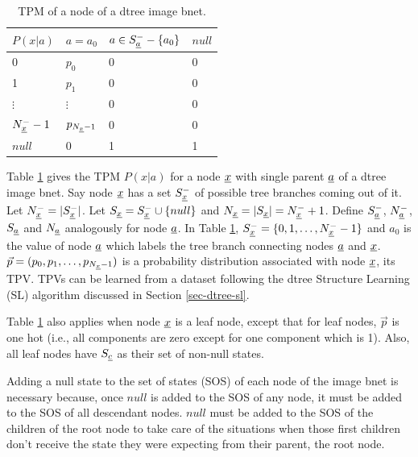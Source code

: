 \begin{table}[]
\centering
\begin{tabular}{|l|l|l|l|}
\hline
$P(x|a)$ & \cellcolor[HTML]{ECF4FF}$a=a_0$ & \cellcolor[HTML]{ECF4FF}$a\in S^-_{\underline{a}}-\{a_0\}$ & \cellcolor[HTML]{ECF4FF}$null$ \\ \hline
\cellcolor[HTML]{ECF4FF}0 & $p_0$ & 0 & 0 \\ \hline
\cellcolor[HTML]{ECF4FF}1 & $p_1$ & 0 & 0 \\ \hline
\cellcolor[HTML]{ECF4FF}$\vdots$ & $\vdots$ & 0 & 0 \\ \hline
\cellcolor[HTML]{ECF4FF}$N^-_{\underline{x}}-1$ & $p_{N_{\underline{x}}-1}$ & 0 & 0 \\ \hline
\cellcolor[HTML]{ECF4FF}$null$ & 0 & 1 & 1 \\ \hline
\end{tabular}
\caption{TPM of a node of a dtree image bnet.}
\label{tab-dtree-tpm}
\end{table}


Table \ref{tab-dtree-tpm}
gives the 
TPM $P(x|a)$
for a node ${\underline{x}}$
with single parent ${\underline{a}}$
of a dtree image bnet. 
Say node ${\underline{x}}$ has 
a set $S^-_{\underline{x}}$
of possible tree branches
coming out of it. 
Let $N^-_{\underline{x}} = |S^-_{\underline{x}}|$.
Let $S_{\underline{x}}=S^-_{\underline{x}}\cup \{null\}$
and $N_{\underline{x}}=|S_{\underline{x}}|=N^-_{\underline{x}}+1$.
Define $S^-_{\underline{a}}$, $N^-_{\underline{a}}$,
$S_{\underline{a}}$
and $N_{\underline{a}}$
analogously for node ${\underline{a}}$.
In Table \ref{tab-dtree-tpm},
$S^-_{\underline{x}}=\{0,1, \ldots, N^-_{\underline{x}}-1\}$
and 
$a_0$ is the value
of node ${\underline{a}}$ which 
labels the tree branch
connecting nodes ${\underline{a}}$ and ${\underline{x}}$.
$\vec{p}=(p_0, p_1, \ldots, p_{N_{\underline{x}}-1})$
is a probability
distribution 
associated with node ${\underline{x}}$,
its TPV.
TPVs
can be learned from
a dataset
following
the dtree Structure Learning (SL)
algorithm
discussed in Section \ref{sec-dtree-sl}.

Table \ref{tab-dtree-tpm}
also applies when node ${\underline{x}}$
is a leaf node,
except that for leaf nodes,
$\vec{p}$ is one hot (i.e., 
all components are zero 
except for one 
component which is 1).
Also, all 
leaf nodes have $S_{\underline{c}}$ as their set of non-null
states.


Adding a null state
to the set of states (SOS) of each node 
of the image bnet
is necessary
because, once $null$
is added 
to the SOS of any node,
it must be added to the SOS
 of all descendant
nodes.
$null$ must be added to the 
SOS of the children of
the root node
to
take care of the situations
when those first children
don't receive the state 
they were expecting from their
parent, the root node.


